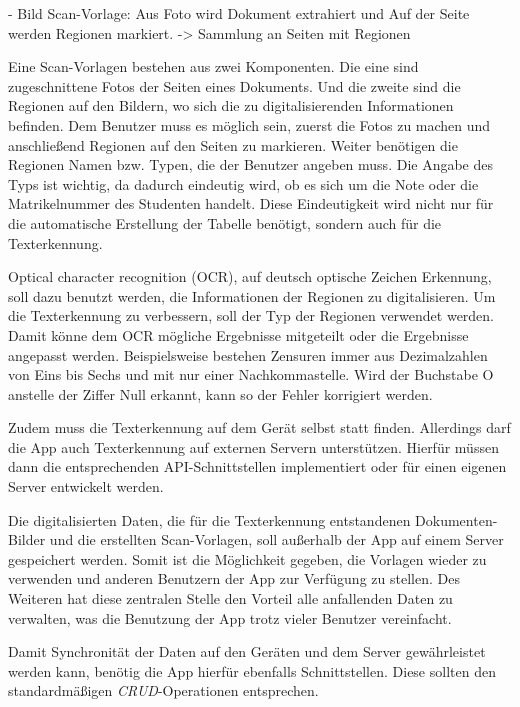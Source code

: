 \documentclass[nomenclature, onesided, 150]{HSMW-Thesis}
\begin{document}
	- Bild Scan-Vorlage: Aus Foto wird Dokument extrahiert und Auf der Seite werden Regionen markiert. -> Sammlung an Seiten mit Regionen
	
	Eine Scan-Vorlagen bestehen aus zwei Komponenten. Die eine sind zugeschnittene Fotos der Seiten eines Dokuments. Und die zweite sind die Regionen auf den Bildern, wo sich die zu digitalisierenden Informationen befinden. Dem Benutzer muss es möglich sein, zuerst die Fotos zu machen und anschließend Regionen auf den Seiten zu markieren. Weiter benötigen die Regionen Namen bzw. Typen, die der Benutzer angeben muss. Die Angabe des Typs ist wichtig, da dadurch eindeutig wird, ob es sich um die Note oder die Matrikelnummer des Studenten handelt. Diese Eindeutigkeit wird nicht nur für die automatische Erstellung der Tabelle benötigt, sondern auch für die Texterkennung. 
	
	Optical character recognition (OCR), auf deutsch optische Zeichen Erkennung, soll dazu benutzt werden, die Informationen der Regionen zu digitalisieren. Um die Texterkennung zu verbessern, soll der Typ der Regionen verwendet werden. Damit könne dem OCR mögliche Ergebnisse mitgeteilt oder die Ergebnisse angepasst werden. Beispielsweise bestehen Zensuren immer aus Dezimalzahlen von Eins bis Sechs und mit nur einer Nachkommastelle. Wird der Buchstabe O anstelle der Ziffer Null erkannt, kann so der Fehler korrigiert werden.
	
	Zudem muss die Texterkennung auf dem Gerät selbst statt finden. Allerdings darf die App auch Texterkennung auf externen Servern unterstützen. Hierfür müssen dann die entsprechenden API-Schnittstellen implementiert oder für einen eigenen Server entwickelt werden.

	Die digitalisierten Daten, die für die Texterkennung entstandenen Dokumenten-Bilder und die erstellten Scan-Vorlagen, soll außerhalb der App auf einem Server gespeichert werden. Somit ist die Möglichkeit gegeben, die Vorlagen wieder zu verwenden und anderen Benutzern der App zur Verfügung zu stellen. Des Weiteren hat diese zentralen Stelle den Vorteil alle anfallenden Daten zu verwalten, was die Benutzung der App trotz vieler Benutzer vereinfacht.
	
	Damit Synchronität der Daten auf den Geräten und dem Server gewährleistet werden kann, benötig die App hierfür ebenfalls Schnittstellen. Diese sollten den standardmäßigen \textit{CRUD}-Operationen entsprechen. 
	
\end{document}
